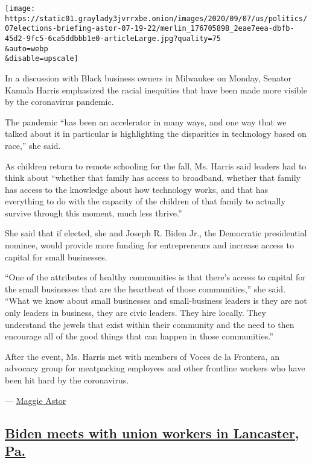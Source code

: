 \texttt{[image: https://static01.graylady3jvrrxbe.onion/images/2020/09/07/us/politics/07elections-briefing-astor-07-19-22/merlin\_176705898\_2eae7eea-dbfb-45d2-9fc5-6ca5ddbbb1e0-articleLarge.jpg?quality=75\\\&auto=webp\\\&disable=upscale]}

In a discussion with Black business owners in Milwaukee on Monday,
Senator Kamala Harris emphasized the racial inequities that have been
made more visible by the coronavirus pandemic.

The pandemic ``has been an accelerator in many ways, and one way that we
talked about it in particular is highlighting the disparities in
technology based on race,'' she said.

As children return to remote schooling for the fall, Ms. Harris said
leaders had to think about ``whether that family has access to
broadband, whether that family has access to the knowledge about how
technology works, and that has everything to do with the capacity of the
children of that family to actually survive through this moment, much
less thrive.''

She said that if elected, she and Joseph R. Biden Jr., the Democratic
presidential nominee, would provide more funding for entrepreneurs and
increase access to capital for small businesses.

``One of the attributes of healthy communities is that there's access to
capital for the small businesses that are the heartbeat of those
communities,'' she said. ``What we know about small businesses and
small-business leaders is they are not only leaders in business, they
are civic leaders. They hire locally. They understand the jewels that
exist within their community and the need to then encourage all of the
good things that can happen in those communities.''

After the event, Ms. Harris met with members of Voces de la Frontera, an
advocacy group for meatpacking employees and other frontline workers who
have been hit hard by the coronavirus.

--- \href{https://www.nytimes3xbfgragh.onion/by/maggie-astor}{Maggie
Astor}

\hypertarget{biden-meets-with-union-workers-in-lancaster-pa}{%
\subsection{\texorpdfstring{\protect\hyperlink{biden-meets-with-union-workers-in-lancaster-pa}{Biden
meets with union workers in Lancaster,
Pa.}}{Biden meets with union workers in Lancaster, Pa.}}\label{biden-meets-with-union-workers-in-lancaster-pa}}

